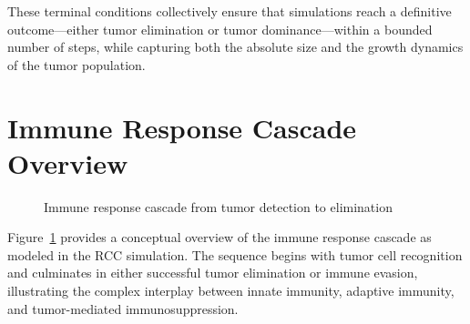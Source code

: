 These terminal conditions collectively ensure that simulations reach a definitive outcome---either tumor elimination or tumor dominance---within a bounded number of steps, while capturing both the absolute size and the growth dynamics of the tumor population.

\section{Immune Response Cascade Overview}
\label{sec:md_immune_cascade}

\begin{figure}[htbp]
\centering
{}
\caption{Immune response cascade from tumor detection to elimination}
\label{fig:immune_response_cascade}
\end{figure}

Figure~\ref{fig:immune_response_cascade} provides a conceptual overview of the immune response cascade as modeled in the RCC simulation. The sequence begins with tumor cell recognition and culminates in either successful tumor elimination or immune evasion, illustrating the complex interplay between innate immunity, adaptive immunity, and tumor-mediated immunosuppression.

